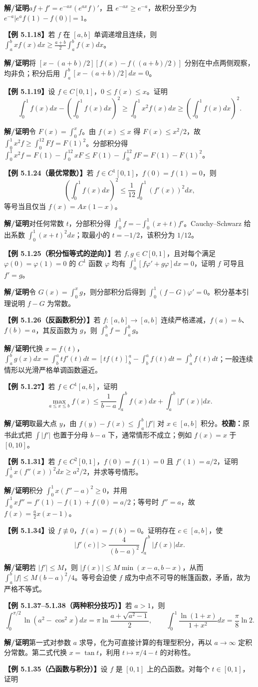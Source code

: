\documentclass[UTF8,a4paper,11pt]{ctexart}
\newcommand{\ex}[1]{\par\medskip\noindent\textbf{【例 #1】}\;}
\newcommand{\sol}{\par\noindent\textbf{解/证明}\;}
\begin{document}
\sol $af+f'=e^{-ax}(e^{ax}f)'$，且 $e^{-ax}\ge e^{-a}$，故积分至少为 $e^{-a}|e^af(1)-f(0)|=1$。
\ex{5.1.18}若 $f$ 在 $[a,b]$ 单调递增且连续，则 $\int_a^bxf(x)dx\ge\frac{a+b}{2}\int_a^bf(x)dx$。
\sol 将 $[x-(a+b)/2][f(x)-f((a+b)/2)]$ 分别在中点两侧观察，均非负；积分后用 $\int_a^b[x-(a+b)/2]dx=0$。
\ex{5.1.19}设 $f\in C[0,1]$，$0\le f(x)\le x$。证明
\[\int_0^1f(x)dx-\left(\int_0^1f(x)dx\right)^2\ge\int_0^1x^2f(x)dx\ge\left(\int_0^1f(x)dx\right)^2.\]
\sol 令 $F(x)=\int_0^xf$。由 $f(x)\le x$ 得 $F(x)\le x^2/2$，故 $\int_0^1x^2f\ge\int_0^12Ff=F(1)^2$。分部积分得 $\int_0^1x^2f=F(1)-\int_0^12xF\le F(1)-\int_0^12fF=F(1)-F(1)^2$。
\ex{5.1.24（最优常数）}若 $f\in C^1[0,1]$，$f(0)=f(1)=0$，则
\[\left(\int_0^1f(x)dx\right)^2\le\frac1{12}\int_0^1(f'(x))^2dx,\]
等号当且仅当 $f(x)=Ax(1-x)$。
\sol 对任何常数 $t$，分部积分得 $\int_0^1f=-\int_0^1(x+t)f'$。Cauchy--Schwarz 给出系数 $\int_0^1(x+t)^2dx$；取最小的 $t=-1/2$，该积分为 $1/12$。
\ex{5.1.25（积分恒等式的逆向）}若 $f,g\in C[0,1]$，且对每个满足 $\varphi(0)=\varphi(1)=0$ 的 $C^1$ 函数 $\varphi$ 均有 $\int_0^1[f\varphi'+g\varphi]dx=0$，证明 $f$ 可导且 $f'=g$。
\sol 令 $G(x)=\int_0^xg$，则分部积分后得到 $\int_0^1(f-G)\varphi'=0$。积分基本引理说明 $f-G$ 为常数。
\ex{5.1.26（反函数积分）}若 $f:[a,b]\to[a,b]$ 连续严格递减，$f(a)=b$、$f(b)=a$，其反函数为 $g$，则 $\int_a^bf=\int_a^bg$。
\sol 代换 $x=f(t)$，$\int_a^bg(x)dx=\int_b^atf'(t)dt=[tf(t)]_b^a-\int_b^af(t)dt=\int_a^bf(t)dt$；一般连续情形以光滑严格单调函数逼近。
\ex{5.1.27}若 $f\in C^1[a,b]$，证明
\[\max_{a\le x\le b}f(x)\le\frac1{b-a}\int_a^bf(x)dx+\int_a^b|f'(x)|dx.\]
\sol 取最大点 $y$，由 $f(y)-f(x)\le\int_a^b|f'|$ 对 $x\in[a,b]$ 积分。\textbf{校勘：}原书此式把 $\int|f'|$ 也置于分母 $b-a$ 下，通常情形不成立；例如 $f(x)=x$ 于 $[0,10]$。
\ex{5.1.31}若 $f\in C^2[0,1]$，$f(0)=f(1)=0$ 且 $f'(1)=a/2$，证明 $\int_0^1x(f''(x))^2dx\ge a^2/2$，并求等号情形。
\sol 积分 $\int_0^1x(f''-a)^2\ge0$，并用 $\int_0^1xf''=f'(1)-f(1)+f(0)=a/2$；等号时 $f''=a$，故 $f(x)=\frac a2x(x-1)$。
\ex{5.1.34}设 $f\not\equiv0$，$f(a)=f(b)=0$。证明存在 $c\in[a,b]$，使
\[|f'(c)|>\frac4{(b-a)^2}\int_a^b|f(x)|dx.\]
\sol 若 $|f'|\le M$，则 $|f(x)|\le M\min(x-a,b-x)$，从而 $\int_a^b|f|\le M(b-a)^2/4$。等号会迫使 $f$ 成为中点不可导的帐篷函数，矛盾，故为严格不等式。
\ex{5.1.37--5.1.38（两种积分技巧）}若 $a>1$，则
\[\int_0^{\pi/2}\ln(a^2-\cos^2x)dx=\pi\ln\frac{a+\sqrt{a^2-1}}2,\qquad \int_0^1\frac{\ln(1+x)}{1+x^2}dx=\frac\pi8\ln2.\]
\sol 第一式对参数 $a$ 求导，化为可直接计算的有理型积分，再以 $a\to\infty$ 定积分常数。第二式代换 $x=\tan t$，利用 $t\mapsto\pi/4-t$ 的对称性。
\ex{5.1.35（凸函数与积分）}设 $f$ 是 $[0,1]$ 上的凸函数。对每个 $t\in[0,1]$，证明
\end{document}
